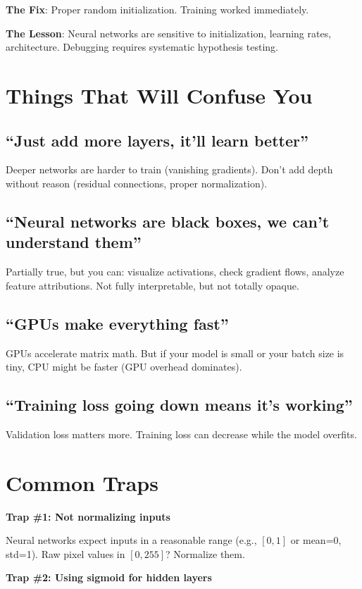 \textbf{The Fix}: Proper random initialization. Training worked immediately.

\textbf{The Lesson}: Neural networks are sensitive to initialization, learning rates, architecture. Debugging requires systematic hypothesis testing.

\section{Things That Will Confuse You}

\subsection{``Just add more layers, it'll learn better''}
Deeper networks are harder to train (vanishing gradients). Don't add depth without reason (residual connections, proper normalization).

\subsection{``Neural networks are black boxes, we can't understand them''}
Partially true, but you can: visualize activations, check gradient flows, analyze feature attributions. Not fully interpretable, but not totally opaque.

\subsection{``GPUs make everything fast''}
GPUs accelerate matrix math. But if your model is small or your batch size is tiny, CPU might be faster (GPU overhead dominates).

\subsection{``Training loss going down means it's working''}
Validation loss matters more. Training loss can decrease while the model overfits.

\section{Common Traps}

\textbf{Trap \#1: Not normalizing inputs}

Neural networks expect inputs in a reasonable range (e.g., $[0,1]$ or mean=0, std=1). Raw pixel values in $[0, 255]$? Normalize them.

\textbf{Trap \#2: Using sigmoid for hidden layers}

